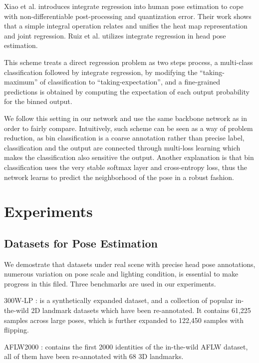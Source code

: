 \documentclass{article}
\begin{document}
\begin{CJK*}{UTF8}{gkai}
Xiao et al.\cite{sun2018integral} introduces integrate regression into human pose estimation to cope with non-differentiable post-processing and quantization error. Their work shows that a simple integral operation relates and unifies the heat map representation and joint regression. Ruiz et al.\cite{ruiz2017fine} utilizes integrate regression in head pose estimation. 

This scheme treats a direct regression problem as two steps process, a multi-class classification followed by integrate regression, by modifying the “taking-maximum” of classification to “taking-expectation”, and a fine-grained predictions is obtained by computing the expectation of each output probability for the binned output.

We follow this setting in our network and use the same backbone network as \cite{ruiz2017fine} in order to fairly compare. Intuitively, such scheme can be seen as a way of problem reduction, as bin classification is a coarse annotation rather than precise label, classification and the output are connected through multi-loss learning which makes the classification also sensitive the output. Another explanation is that bin classification uses the very stable softmax layer and cross-entropy loss, thus the network learns to predict the neighborhood of the pose in a robust fashion.

\section{Experiments}
\label{sec:majhead}
\subsection{Datasets for Pose Estimation}
\label{ssec:subhead}
We demostrate that datasets under real scene with precise head pose annotations, numerous variation on pose scale and lighting condition, is essential to make progress in this filed. Three benchmarks are used in our experiments.

300W-LP \cite{zhu2016face}: is a synthetically expanded dataset, and a collection of popular in-the-wild 2D landmark datasets which have been re-annotated. It contains 61,225 samples across large poses, which is further expanded to 122,450 samples with flipping.

AFLW2000 \cite{koestinger2011annotated}: contains the first 2000 identities of the in-the-wild AFLW dataset, all of them have been re-annotated with 68 3D landmarks.


\end{CJK*}
\end{document}
